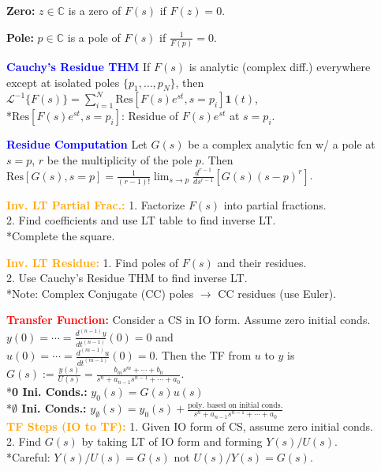 \documentclass[5pt]{extarticle} %
\begin{document}
\begin{paracol}{3}
{    \textbf{Zero:} $z \in \mathbb{C}$ is a zero of $F(s)$ if $F(z) = 0$.  

    \textbf{Pole:} $p \in \mathbb{C}$ is a pole of $F(s)$ if $\frac{1}{F(p)} = 0$.  

    \textcolor{blue}{\textbf{Cauchy's Residue THM}} If $F(s)$ is analytic (complex diff.) everywhere except at isolated poles $\{p_1, \dots, p_N\}$, then \\
    $\mathcal{L}^{-1} \{ F(s) \} = \sum_{i=1}^N \text{Res} \left[ F(s) e^{st}, s = p_i \right] \mathbf{1}(t)$,  \\
    *$\text{Res}[F(s)e^{st}, s = p_i]$: Residue of $F(s)e^{st}$ at $s = p_i$.  
    
    \textcolor{blue}{\textbf{Residue Computation}} Let $G(s)$ be a complex analytic fcn w/ a pole at $s = p$, $r$ be the multiplicity of the pole $p$. Then  
    $\text{Res}[G(s), s = p] = \frac{1}{(r-1)!} \lim_{s \to p} \frac{d^{r-1}}{ds^{r-1}} \left[ G(s) (s-p)^r \right]$.  

    \textcolor{orange}{\textbf{Inv. LT Partial Frac.:}} 1. Factorize $F(s)$ into partial fractions. \\
    2. Find coefficients and use LT table to find inverse LT. \\
    *Complete the square. 

    \textcolor{orange}{\textbf{Inv. LT Residue:}} 1. Find poles of $F(s)$ and their residues. \\
    2. Use Cauchy's Residue THM to find inverse LT. \\
    *Note: Complex Conjugate (CC) poles $\rightarrow$ CC residues (use Euler).

    \textcolor{red}{\textbf{Transfer Function:}} Consider a CS in IO form. Assume zero initial conds. $y(0) = \cdots = \frac{d^{(n-1)}y}{dt^{(n-1)}}(0) = 0$ and \\ 
    $u(0) = \cdots = \frac{d^{(m-1)} u}{dt^{(m-1)}}(0) = 0$. Then the TF from $u$ to $y$ is \\
    $G(s) := \frac{y(s)}{U(s)} = \frac{b_m s^m + \cdots + b_0}{s^n + a_{n-1} s^{n-1} + \cdots + a_0}$. \\
    *\textbf{0 Ini. Conds.:} $y_0(s) = G(s) u(s)$ \\
    *\textbf{$\emptyset$ Ini. Conds.:} $y_{\emptyset}(s) = y_0(s) + \frac{\text{poly. based on initial conds.}}{s^n + a_{n-1} s^{n-1} + \cdots + a_0}$ \\

    \textcolor{orange}{\textbf{TF Steps (IO to TF):}} 1. Given IO form of CS, assume zero initial conds. \\
    2. Find $G(s)$ by taking LT of IO form and forming $Y(s)/U(s)$. \\
    *Careful: $Y(s)/U(s) = G(s)$ not $U(s)/Y(s) = G(s)$.

}
\end{paracol}
\end{document}
